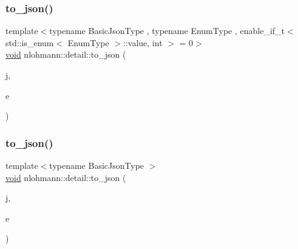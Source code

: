 \mbox{\label{namespacenlohmann_1_1detail_a0c8b159dba71981d6c555d284cf6e2bf}} 
\subsubsection{\texorpdfstring{to\_json()}{to\_json()}\hspace{0.1cm}{\footnotesize\ttfamily [7/17]}}
{\footnotesize\ttfamily template$<$typename Basic\+Json\+Type , typename Enum\+Type , enable\+\_\+if\+\_\+t$<$ std\+::is\+\_\+enum$<$ Enum\+Type $>$\+::value, int $>$  = 0$>$ \\
\mbox{\hyperlink{namespacenlohmann_1_1detail_a59fca69799f6b9e366710cb9043aa77d}{void}} nlohmann\+::detail\+::to\+\_\+json (\begin{DoxyParamCaption}\item[{Basic\+Json\+Type \&}]{j,  }\item[{Enum\+Type}]{e }\end{DoxyParamCaption})\hspace{0.3cm}{\ttfamily [noexcept]}}

\mbox{\label{namespacenlohmann_1_1detail_aeca6fb5fede5ed1e12a4420d98a5692b}} 
\subsubsection{\texorpdfstring{to\_json()}{to\_json()}\hspace{0.1cm}{\footnotesize\ttfamily [8/17]}}
{\footnotesize\ttfamily template$<$typename Basic\+Json\+Type $>$ \\
\mbox{\hyperlink{namespacenlohmann_1_1detail_a59fca69799f6b9e366710cb9043aa77d}{void}} nlohmann\+::detail\+::to\+\_\+json (\begin{DoxyParamCaption}\item[{Basic\+Json\+Type \&}]{j,  }\item[{const std\+::vector$<$ bool $>$ \&}]{e }\end{DoxyParamCaption})}

\mbox{\label{namespacenlohmann_1_1detail_a3afebc132c5ff83f9cd160e52030fdfd}} 
